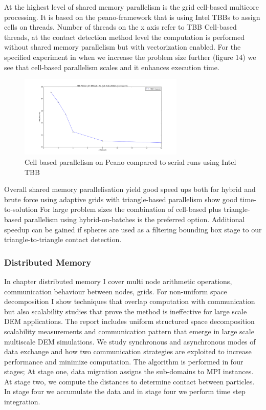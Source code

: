 \documentclass[times,12pt]{article}
\begin{document}
At the highest level of shared memory parallelism is the grid cell-based multicore processing. It is based on the peano-framework that is using Intel TBBs to assign cells on threads. Number of threads on the x axis refer to TBB Cell-based threads, at the contact detection method level the computation is performed without shared memory parallelism but with vectorization enabled. For the specified experiment in when we increase the problem size further (figure 14) we see that cell-based parallelism scales and it enhances execution time. 

\begin{figure}[htb]
  \begin{center}
    \includegraphics[width=0.7\textwidth]{experiments/random/omp/tbb_regular_x2.png}
  \end{center}
  \caption{Cell based parallelism on Peano compared to serial runs using Intel TBB}
  \label{tbb_scaling14}
\end{figure}

Overall shared memory parallelisation yield good speed ups both for hybrid and brute force using adaptive grids with triangle-based parallelism show good time-to-solution For large problem sizes the combination of cell-based plus triangle-based parallelism using hybrid-on-batches is the preferred option. Additional speedup can be gained if spheres are used as a filtering bounding box stage to our triangle-to-triangle contact detection.

\subsubsection{Distributed Memory}

In chapter distributed memory I cover multi node arithmetic operations, communication behaviour between nodes, grids. For non-uniform space decomposition I show techniques that overlap computation with communication but also scalability studies that prove the method is ineffective for large scale DEM applications. The report includes uniform structured space decomposition scalability measurements and communication pattern that emerge in large scale multiscale DEM simulations. We study synchronous and asynchronous modes of data exchange and how two communication strategies are exploited to increase performance and minimize computation. The algorithm is performed in four stages; At stage one, data migration assigns the sub-domains to MPI instances. At stage two, we compute the distances to determine contact between particles. In stage four we accumulate the data and in stage four we perform time step integration.
\end{document}
